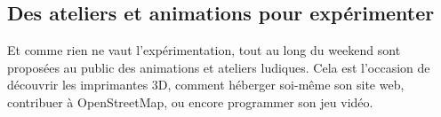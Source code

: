 \subsection{Des ateliers et animations pour expérimenter}


\begin{minipage}{0.6\textwidth}
Et comme rien ne vaut l'expérimentation, tout au long du weekend sont 
proposées au public des animations et ateliers ludiques. Cela est 
l'occasion de découvrir les imprimantes 3D, comment héberger soi-même son 
site web, contribuer à OpenStreetMap, ou encore programmer son jeu vidéo.
\end{minipage}
\begin{minipage}{0.4\textwidth}
\end{minipage}

